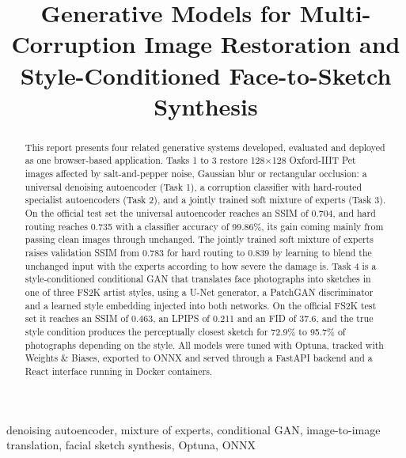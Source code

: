 \documentclass[conference]{IEEEtran}
\begin{document}
\title{Generative Models for Multi-Corruption Image Restoration and Style-Conditioned Face-to-Sketch Synthesis}

\author{
}

\maketitle

\begin{abstract}
This report presents four related generative systems developed, evaluated and deployed as one browser-based application. Tasks 1 to 3 restore 128$\times$128 Oxford-IIIT Pet images affected by salt-and-pepper noise, Gaussian blur or rectangular occlusion: a universal denoising autoencoder (Task 1), a corruption classifier with hard-routed specialist autoencoders (Task 2), and a jointly trained soft mixture of experts (Task 3). On the official test set the universal autoencoder reaches an SSIM of 0.704, and hard routing reaches 0.735 with a classifier accuracy of 99.86\%, its gain coming mainly from passing clean images through unchanged. The jointly trained soft mixture of experts raises validation SSIM from 0.783 for hard routing to 0.839 by learning to blend the unchanged input with the experts according to how severe the damage is. Task 4 is a style-conditioned conditional GAN that translates face photographs into sketches in one of three FS2K artist styles, using a U-Net generator, a PatchGAN discriminator and a learned style embedding injected into both networks. On the official FS2K test set it reaches an SSIM of 0.463, an LPIPS of 0.211 and an FID of 37.6, and the true style condition produces the perceptually closest sketch for 72.9\% to 95.7\% of photographs depending on the style. All models were tuned with Optuna, tracked with Weights \& Biases, exported to ONNX and served through a FastAPI backend and a React interface running in Docker containers.
\end{abstract}

\begin{IEEEkeywords}
denoising autoencoder, mixture of experts, conditional GAN, image-to-image translation, facial sketch synthesis, Optuna, ONNX
\end{IEEEkeywords}
\end{document}
